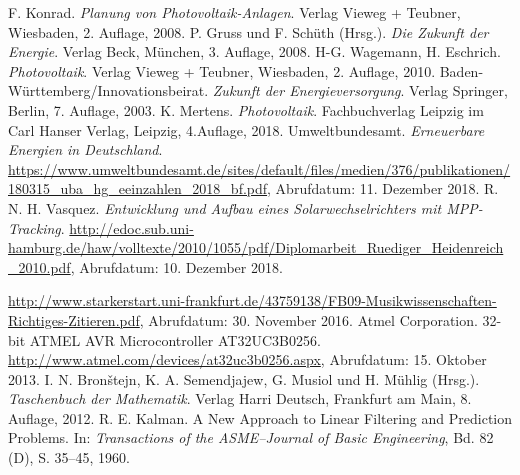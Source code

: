 \begin{thebibliography}{99}
	 F. Konrad. {\itshape Planung von Photovoltaik-Anlagen}. Verlag Vieweg + Teubner, Wiesbaden, 2. Auflage, 2008.
	 P. Gruss und F. Schüth (Hrsg.). {\itshape Die Zukunft der Energie}. Verlag Beck, München, 3. Auflage, 2008.
	 H-G. Wagemann, H. Eschrich. {\itshape Photovoltaik}. Verlag Vieweg + Teubner, Wiesbaden, 2. Auflage, 2010.
	 Baden-Württemberg/Innovationsbeirat. {\itshape Zukunft der Energieversorgung}. Verlag Springer, Berlin, 7. Auflage, 2003.
	 K. Mertens. {\itshape Photovoltaik}. Fachbuchverlag Leipzig im Carl Hanser Verlag, Leipzig, 4.Auflage, 2018.
	 Umweltbundesamt. {\itshape Erneuerbare Energien in Deutschland}. \url{https://www.umweltbundesamt.de/sites/default/files/medien/376/publikationen/180315_uba_hg_eeinzahlen_2018_bf.pdf}, Abrufdatum: 11. Dezember 2018.
	 R. N. H. Vasquez. {\itshape Entwicklung und Aufbau eines Solarwechselrichters mit MPP-Tracking}. \url{http://edoc.sub.uni-hamburg.de/haw/volltexte/2010/1055/pdf/Diplomarbeit_Ruediger_Heidenreich_2010.pdf}, Abrufdatum: 10. Dezember 2018.
	
	 \url{http://www.starkerstart.uni-frankfurt.de/43759138/FB09-Musikwissenschaften-Richtiges-Zitieren.pdf}, Abrufdatum: 30. November 2016.
	 Atmel Corporation. 32-bit ATMEL AVR Microcontroller AT32UC3B0256. \url{http://www.atmel.com/devices/at32uc3b0256.aspx}, Abrufdatum: 15. Oktober 2013.
	 I. N. Bron\v{s}tejn, K. A. Semendjajew, G. Musiol und H. Mühlig (Hrsg.). {\itshape Taschenbuch der Mathematik}. Verlag Harri Deutsch, Frankfurt am Main, 8. Auflage, 2012.
	 R. E. Kalman. A New Approach to Linear Filtering and Prediction Problems. In: {\itshape Transactions of the ASME--Journal of Basic Engineering}, Bd. 82 (D), S. 35--45, 1960.
	
\end{thebibliography}